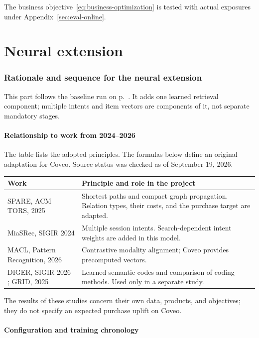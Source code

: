 \documentclass[12pt,a4paper]{article}
\theoremstyle{plainru}
\begin{document}
The business objective~\eqref{eq:business-optimization} is tested
with actual exposures under Appendix~\ref{sec:eval-online}.

\clearpage\part{Neural extension}\label{part:neural}
\section{Rationale and sequence for the neural extension}\label{sec:research}

This part follows the baseline run on p.~\pageref{sec:first-run}.
It adds one learned retrieval component; multiple intents and item
vectors are components of it, not separate mandatory stages.

\subsection{Relationship to work from 2024--2026}

The table lists the adopted principles. The formulas below define
an original adaptation for Coveo. Source status was checked
as of September 19, 2026.

\begin{longtable}{L{0.26\textwidth}L{0.64\textwidth}}
\toprule Work & Principle and role in the project \\\midrule\endhead
SPARE, ACM TORS, 2025 \cite{spare2025} &
Shortest paths and compact graph propagation.
Relation types, their costs, and the purchase target are adapted. \\
MiaSRec, SIGIR 2024 \cite{miasrec2024} &
Multiple session intents. Search-dependent intent weights
are added in this model. \\
MACL, Pattern Recognition, 2026 \cite{macl2025} &
Contrastive modality alignment; Coveo provides precomputed
vectors. \\
DIGER, SIGIR 2026 \cite{diger2026}; GRID, 2025 \cite{grid2025} &
Learned semantic codes and comparison of coding methods.
Used only in a separate study. \\
\bottomrule
\end{longtable}

The results of these studies concern their own data, products, and objectives;
they do not specify an expected purchase uplift on Coveo.

\subsection{Configuration and training chronology}
\end{document}
